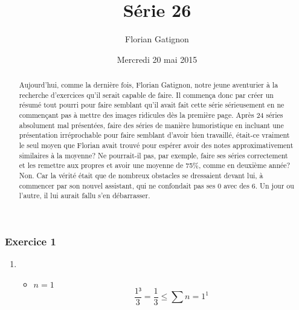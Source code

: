 \documentclass[a4paper]{article}
\title{Série 26}
\author{Florian Gatignon}
\date{Mercredi 20 mai 2015}
\begin{document}
\maketitle

\begin{abstract}

Aujourd’hui, comme la dernière fois, Florian Gatignon, notre jeune
aventurier à la recherche d’exercices qu’il serait capable de faire. Il commença donc par créer un résumé tout pourri pour faire semblant qu’il avait fait cette série sérieusement en ne commençant pas à mettre des
images ridicules dès la première page. Après 24 séries absolument mal
présentées, faire des séries de manière humoristique en incluant une présentation irréprochable pour faire semblant d’avoir bien travaillé, était-ce
vraiment le seul moyen que Florian avait trouvé pour espérer avoir des
notes approximativement similaires à la moyenne? Ne pourrait-il pas, par
exemple, faire ses séries correctement et les remettre aux propres et avoir
une moyenne de 75\%, comme en deuxième année?
Non. Car la vérité était que de nombreux obstacles se dressaient devant
lui, à commencer par son nouvel assistant, qui ne confondait pas ses 0
avec des 6.\newline
Un jour ou l’autre, il lui aurait fallu s’en débarrasser.
\end{abstract}

\subsubsection*{Exercice 1}

\renewcommand{\labelenumi}{\alph{enumi}) }
\begin{enumerate}
\item
        \begin{itemize}
		\item        \textbf{$n = 1$}
                $$\frac{1³}{3}  = \frac{1}{3}  \le \sum\limits{n=1}^1 $$
        \end{itemize}

\end{enumerate}
\end{document}
